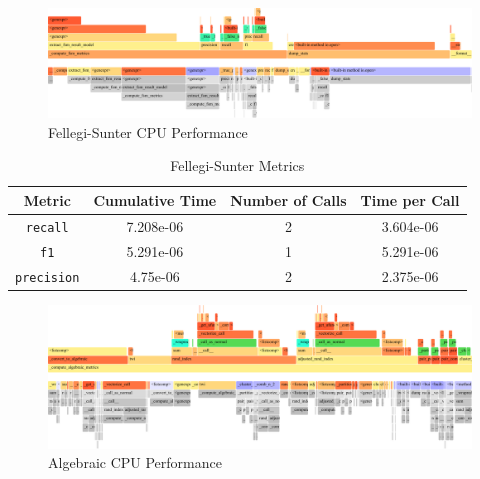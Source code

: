 \documentclass[a4paper,twoside]{article}
\begin{document}
    \begin{figure}[htbp]
        \centering
        \includegraphics[width=\textwidth]{performance/fs-flamegraph}
        \caption{Fellegi-Sunter CPU Performance}\label{appendix:fig:fs-cpu-perf}
    \end{figure}

    \begin{table}[htbp]
        \centering
        \begin{tabular}{c c c c}
            \toprule
            Metric & Cumulative Time & Number of Calls & Time per Call \\ [0.5ex]
            \toprule
            \texttt{recall} & 7.208e-06 & 2 & 3.604e-06 \\
            \midrule
            \texttt{f1} & 5.291e-06 & 1 & 5.291e-06 \\
            \midrule
            \texttt{precision} & 4.75e-06 & 2 & 2.375e-06 \\
            \bottomrule
        \end{tabular}
        \caption{Fellegi-Sunter Metrics}\label{appendix:table:fs-cpu-perf}
    \end{table}

    \begin{figure}[htbp]
        \includegraphics[width=\textwidth]{performance/algebraic-flamegraph}
        \caption{Algebraic CPU Performance}\label{appendix:fig:alg-cpu-perf}
    \end{figure}
\end{document}
